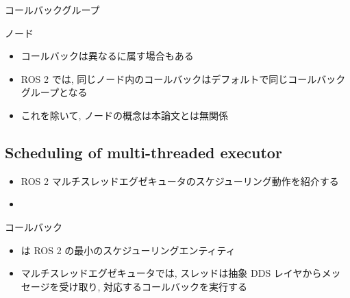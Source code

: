 \begin{frame}{コールバックグループ}

\end{frame}

\begin{frame}{ノード}
    \begin{itemize}
        \item コールバックは異なるに属す場合もある
        \item ROS 2 では, 同じノード内のコールバックはデフォルトで同じコールバックグループとなる
        \item これを除いて, ノードの概念は本論文とは無関係
    \end{itemize}

\end{frame}


\subsection{Scheduling of multi-threaded executor}
\label{ssec: scheduling_of_multi_threaded_executor}

\begin{frame}{}
    \begin{itemize}
        \item ROS 2 マルチスレッドエグゼキュータのスケジューリング動作を紹介する
        \item {}
    \end{itemize}

\end{frame}

\begin{frame}{コールバック}
    \begin{itemize}
        \item {}は ROS 2 の最小のスケジューリングエンティティ
        \item マルチスレッドエグゼキュータでは, スレッドは抽象 DDS レイヤからメッセージを受け取り, 対応するコールバックを実行する
    \end{itemize}
\end{frame}

